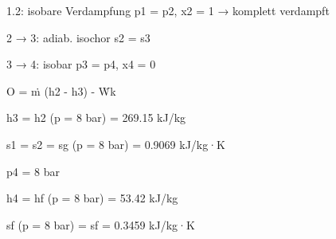 1.2: isobare Verdampfung p1 = p2, x2 = 1 → komplett verdampft

2 → 3: adiab. isochor s2 = s3

3 → 4: isobar p3 = p4, x4 = 0

O = ṁ (h2 - h3) - Ẇk

h3 = h2 (p = 8 bar) = 269.15 kJ/kg

s1 = s2 = sg (p = 8 bar) = 0.9069 kJ/kg·K

p4 = 8 bar

h4 = hf (p = 8 bar) = 53.42 kJ/kg

sf (p = 8 bar) = sf = 0.3459 kJ/kg·K